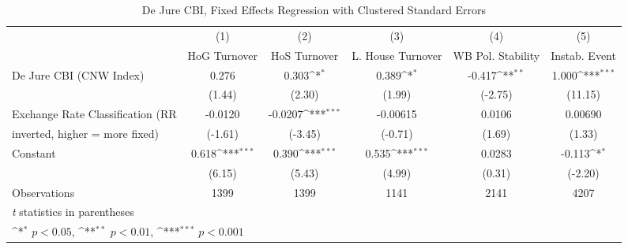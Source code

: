\begin{table}[htbp]\centering
\def\sym#1{\ifmmode^{#1}\else\(^{#1}\)\fi}
\caption{De Jure CBI, Fixed Effects Regression with Clustered Standard Errors \label{multIndFEDJ}}
\begin{tabular}{l*{5}{c}}
\toprule
                                        &\multicolumn{1}{c}{(1)}&\multicolumn{1}{c}{(2)}&\multicolumn{1}{c}{(3)}&\multicolumn{1}{c}{(4)}&\multicolumn{1}{c}{(5)}\\
                                        &\multicolumn{1}{c}{HoG Turnover}&\multicolumn{1}{c}{HoS Turnover}&\multicolumn{1}{c}{L. House Turnover}&\multicolumn{1}{c}{WB Pol. Stability}&\multicolumn{1}{c}{Instab. Event}\\
\midrule
De Jure CBI (CNW Index)                 &    0.276         &    0.303\sym{*}  &    0.389\sym{*}  &   -0.417\sym{**} &    1.000\sym{***}\\
                                        &   (1.44)         &   (2.30)         &   (1.99)         &  (-2.75)         &  (11.15)         \\
\addlinespace
Exchange Rate Classification (RR        &  -0.0120         &  -0.0207\sym{***}& -0.00615         &   0.0106         &  0.00690         \\
inverted, higher = more fixed)          &  (-1.61)         &  (-3.45)         &  (-0.71)         &   (1.69)         &   (1.33)         \\
\addlinespace
Constant                                &    0.618\sym{***}&    0.390\sym{***}&    0.535\sym{***}&   0.0283         &   -0.113\sym{*}  \\
                                        &   (6.15)         &   (5.43)         &   (4.99)         &   (0.31)         &  (-2.20)         \\
\midrule
Observations                            &     1399         &     1399         &     1141         &     2141         &     4207         \\
\bottomrule
\multicolumn{6}{l}{\footnotesize \textit{t} statistics in parentheses}\\
\multicolumn{6}{l}{\footnotesize \sym{*} \(p<0.05\), \sym{**} \(p<0.01\), \sym{***} \(p<0.001\)}\\
\end{tabular}
\end{table}
